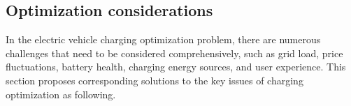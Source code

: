 \documentclass[
	english,
	ruledheaders=section,%
	class=report,%
	thesis={type=Report},%
	accentcolor=9c,%
	custommargins=true,%
	marginpar=false,%
	parskip=half-,%
	fontsize=11pt,%
	logofile={img/tuda_logo.pdf}, %
]{tudapub}
\begin{document}
\subsection{Optimization considerations}
\label{sbusec: Optimization considerations}


In the electric vehicle charging optimization problem, there are numerous challenges that need to be considered comprehensively, such as grid load, price fluctuations, battery health, charging energy sources, and user experience. This section proposes corresponding solutions to the key issues of charging optimization as following.
\end{document}
